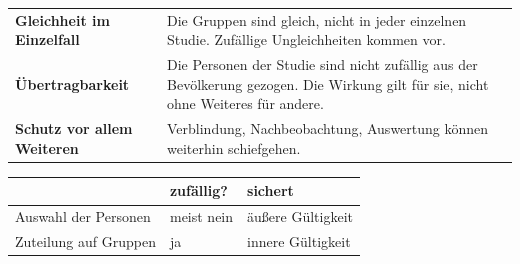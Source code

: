 \begin{warnung}
\begin{center}
\renewcommand{\arraystretch}{1.5}
\begin{tabular}{@{}P{3.0cm}P{5.6cm}@{}}
\toprule
\textbf{Gleichheit im Einzelfall} & Die Gruppen sind  gleich, nicht in jeder einzelnen Studie. Zufällige Ungleichheiten kommen vor.\\
\textbf{Übertrag\-barkeit} & Die Personen der Studie sind nicht zufällig aus der Bevölkerung gezogen. Die Wirkung gilt für sie, nicht ohne Weiteres für andere.\\
\textbf{Schutz vor allem Weiteren} & Verblindung, Nachbeobachtung, Auswertung können weiterhin schiefgehen.\\
\bottomrule
\end{tabular}
\end{center}

\begin{center}
{\small
\renewcommand{\arraystretch}{1.5}
\begin{tabular}{@{}P{2.6cm}P{2.4cm}P{3.0cm}@{}}
\toprule
& \textbf{zufällig?} & \textbf{sichert}\\
\midrule
Auswahl der Personen & \textcolor{akzent}{meist nein} & äußere Gültigkeit\\
Zuteilung auf Gruppen & \textcolor{gruen}{ja} & innere Gültigkeit\\
\bottomrule
\end{tabular}}
\end{center}

\begin{center}
\begin{minipage}{0.88\textwidth}
\end{minipage}
\end{center}
\end{warnung}

